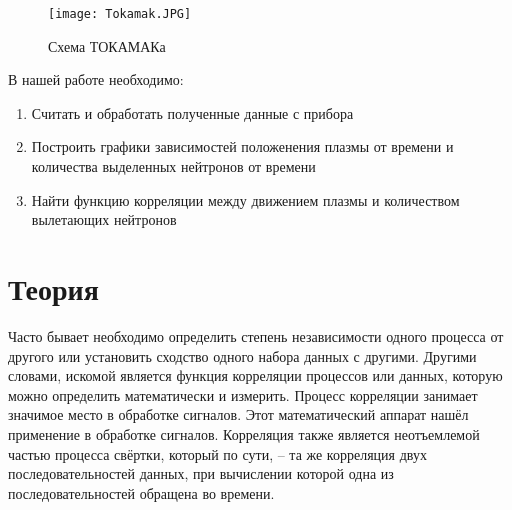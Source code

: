 \documentclass{article}
\begin{document}
\begin{figure}[H]
		\centering
		\texttt{[image: Tokamak.JPG]}
		\caption{Схема ТОКАМАКа}
		\label{fig:sP}
	\end{figure}
\noindent В нашей работе необходимо:
\begin{enumerate}
    \item Считать и обработать полученные данные с прибора
    \item Построить графики зависимостей положенения плазмы от времени и количества выделенных нейтронов от времени
    \item Найти функцию корреляции между движением плазмы и количеством вылетающих нейтронов
\end{enumerate}

\section{Теория}
\noindent Часто бывает необходимо определить степень независимости одного процесса от другого или установить сходство одного набора данных с другими. Другими словами, искомой является функция корреляции процессов или данных, которую можно определить математически и измерить. Процесс корреляции занимает значимое место в обработке сигналов. Этот математический аппарат нашёл применение в обработке сигналов. Корреляция также является неотъемлемой частью процесса свёртки, который по сути, -- та же корреляция двух последовательностей данных, при вычислении которой одна из последовательностей обращена во времени.
\end{document}

